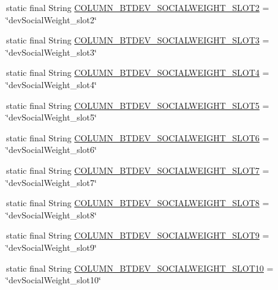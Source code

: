 \begin{DoxyCompactItemize}
\item 
static final String \hyperlink{classcom_1_1social_1_1proximity_1_1_s_q_lite_helper_af21ae06cc954eb56b05dabcb682e3571}{C\+O\+L\+U\+M\+N\+\_\+\+B\+T\+D\+E\+V\+\_\+\+S\+O\+C\+I\+A\+L\+W\+E\+I\+G\+H\+T\+\_\+\+S\+L\+O\+T2} = \char`\"{}dev\+Social\+Weight\+\_\+slot2\char`\"{}
\item 
static final String \hyperlink{classcom_1_1social_1_1proximity_1_1_s_q_lite_helper_af648dcc55968d0857315b6f1e2ea7bd5}{C\+O\+L\+U\+M\+N\+\_\+\+B\+T\+D\+E\+V\+\_\+\+S\+O\+C\+I\+A\+L\+W\+E\+I\+G\+H\+T\+\_\+\+S\+L\+O\+T3} = \char`\"{}dev\+Social\+Weight\+\_\+slot3\char`\"{}
\item 
static final String \hyperlink{classcom_1_1social_1_1proximity_1_1_s_q_lite_helper_a71c55d8a651651735eb03c39bfd33ffe}{C\+O\+L\+U\+M\+N\+\_\+\+B\+T\+D\+E\+V\+\_\+\+S\+O\+C\+I\+A\+L\+W\+E\+I\+G\+H\+T\+\_\+\+S\+L\+O\+T4} = \char`\"{}dev\+Social\+Weight\+\_\+slot4\char`\"{}
\item 
static final String \hyperlink{classcom_1_1social_1_1proximity_1_1_s_q_lite_helper_acf03bd9df5a5d9aff1736e8279f0c18f}{C\+O\+L\+U\+M\+N\+\_\+\+B\+T\+D\+E\+V\+\_\+\+S\+O\+C\+I\+A\+L\+W\+E\+I\+G\+H\+T\+\_\+\+S\+L\+O\+T5} = \char`\"{}dev\+Social\+Weight\+\_\+slot5\char`\"{}
\item 
static final String \hyperlink{classcom_1_1social_1_1proximity_1_1_s_q_lite_helper_aba87fe71d289765dc72304a6474eb21b}{C\+O\+L\+U\+M\+N\+\_\+\+B\+T\+D\+E\+V\+\_\+\+S\+O\+C\+I\+A\+L\+W\+E\+I\+G\+H\+T\+\_\+\+S\+L\+O\+T6} = \char`\"{}dev\+Social\+Weight\+\_\+slot6\char`\"{}
\item 
static final String \hyperlink{classcom_1_1social_1_1proximity_1_1_s_q_lite_helper_af4e04fe6db4068a7bc14dd98ceb4ad46}{C\+O\+L\+U\+M\+N\+\_\+\+B\+T\+D\+E\+V\+\_\+\+S\+O\+C\+I\+A\+L\+W\+E\+I\+G\+H\+T\+\_\+\+S\+L\+O\+T7} = \char`\"{}dev\+Social\+Weight\+\_\+slot7\char`\"{}
\item 
static final String \hyperlink{classcom_1_1social_1_1proximity_1_1_s_q_lite_helper_a53e97bb3b563d46746140235cf0f2db0}{C\+O\+L\+U\+M\+N\+\_\+\+B\+T\+D\+E\+V\+\_\+\+S\+O\+C\+I\+A\+L\+W\+E\+I\+G\+H\+T\+\_\+\+S\+L\+O\+T8} = \char`\"{}dev\+Social\+Weight\+\_\+slot8\char`\"{}
\item 
static final String \hyperlink{classcom_1_1social_1_1proximity_1_1_s_q_lite_helper_a1fe7a2cfa003028ed870c3d9fd9c68fa}{C\+O\+L\+U\+M\+N\+\_\+\+B\+T\+D\+E\+V\+\_\+\+S\+O\+C\+I\+A\+L\+W\+E\+I\+G\+H\+T\+\_\+\+S\+L\+O\+T9} = \char`\"{}dev\+Social\+Weight\+\_\+slot9\char`\"{}
\item 
static final String \hyperlink{classcom_1_1social_1_1proximity_1_1_s_q_lite_helper_a9f98a31fa6165552da5bbdf5933728cc}{C\+O\+L\+U\+M\+N\+\_\+\+B\+T\+D\+E\+V\+\_\+\+S\+O\+C\+I\+A\+L\+W\+E\+I\+G\+H\+T\+\_\+\+S\+L\+O\+T10} = \char`\"{}dev\+Social\+Weight\+\_\+slot10\char`\"{}

\end{DoxyCompactItemize}
